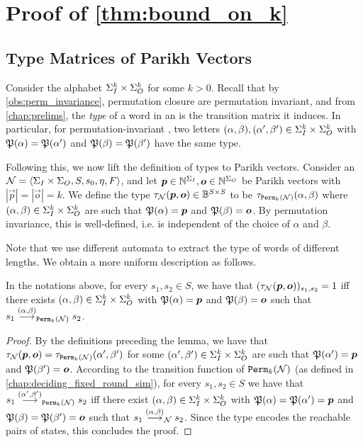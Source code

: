 \section{Proof of \autoref{thm:bound_on_k}}
\label{sec:proof_of_bound}
\subsection*{Type Matrices of Parikh Vectors}
Consider the alphabet $\Sigma_{I}^k\times \Sigma_{O}^k$ for some $k>0$.
Recall that by \autoref{obs:perm_invariance}, permutation closure \NFAs are permutation invariant, and from \autoref{chap:prelims}, the \emph{type} of a word in an \NFA is the transition matrix it induces.
In particular, for permutation-invariant \NFAs, two letters $(\alpha,\beta),(\alpha',\beta')\in \Sigma_{I}^k\times \Sigma_{O}^k$ with $\mathfrak{P}(\alpha)=\mathfrak{P}(\alpha')$ and $\mathfrak{P}(\beta)=\mathfrak{P}(\beta')$ have the same type.

Following this, we now lift the definition of types to Parikh vectors. Consider an \NFA $\mathcal{N}=\left< \Sigma_{I}\times \Sigma_{O},S,s_0,\eta,F\right>$, and let $\boldsymbol{p}\in \mathbb{N}^{\Sigma_{I}},\boldsymbol{o}\in \mathbb{N}^{\Sigma_{O}}$ be Parikh vectors with $|\vec{p}|=|\vec{o}|=k$. We define the type $\tau_{\mathcal{N}}(\boldsymbol{p},\boldsymbol{o})\in \mathbb{B}^{S\times S}$ to be $\tau_{{\mathtt{Perm}}_k(\mathcal{N})}(\alpha,\beta)$ where $(\alpha,\beta)\in \Sigma_{I}^k\times \Sigma_{O}^k$ are such that $\mathfrak{P}(\alpha)=\boldsymbol{p}$ and $\mathfrak{P}(\beta)=\boldsymbol{o}$. By permutation invariance, this is well-defined, i.e. is independent of the choice of $\alpha$ and $\beta$.

Note that we use different automata to extract the type of words of different lengths. We obtain a more uniform description as follows.
\begin{lemma}
\label{lem:type_of_parikh}
    In the notations above, for every $s_1,s_2\in S$, we have that $(\tau_{\mathcal{N}}(\boldsymbol{p},\boldsymbol{o}))_{s_1,s_2}=1$ iff there exists $(\alpha,\beta)\in \Sigma_{I}^k\times \Sigma_{O}^k$ with $\mathfrak{P}(\alpha)=\boldsymbol{p}$ and $\mathfrak{P}(\beta)=\boldsymbol{o}$ such that $s_1\stackrel{(\alpha,\beta)}{\longrightarrow}_{{\mathtt{Perm}}_k(\mathcal{N})}s_2$.
\end{lemma}
\begin{proof}
    By the definitions preceding the lemma, we have that $\tau_{\mathcal{N}}(\boldsymbol{p},\boldsymbol{o})=\tau_{{\mathtt{Perm}}_k(\mathcal{N})}(\alpha',\beta')$ for some $(\alpha',\beta')\in \Sigma_{I}^k\times \Sigma_{O}^k$ are such that $\mathfrak{P}(\alpha')=\boldsymbol{p}$ and $\mathfrak{P}(\beta')=\boldsymbol{o}$. According to the transition function of ${\mathtt{Perm}}_k(\mathcal{N})$ (as defined in \autoref{chap:deciding_fixed_round_sim}), for every $s_1,s_2\in S$ we have that $s_1\stackrel{(\alpha',\beta')}{\longrightarrow}_{{\mathtt{Perm}}_k(\mathcal{N})}s_2$ iff there exist $(\alpha,\beta)\in \Sigma_{I}^k\times \Sigma_{O}^k$ with $\mathfrak{P}(\alpha)=\mathfrak{P}(\alpha')=\boldsymbol{p}$ and $\mathfrak{P}(\beta)=\mathfrak{P}(\beta')=\boldsymbol{o}$ such that $s_1\stackrel{(\alpha,\beta)}{\longrightarrow}_{\mathcal{N}}s_2$. Since the type encodes the reachable pairs of states, this concludes the proof.
\end{proof}

